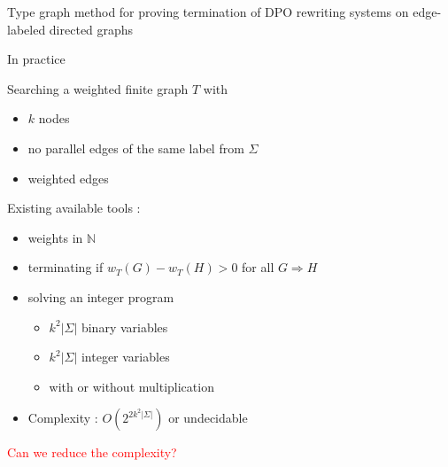\documentclass{beamer}
\begin{document}
\begin{frame}{Type graph method for proving termination of DPO rewriting systems on edge-labeled directed graphs}

    In practice

      Searching a weighted finite graph \( T \) with 
      \begin{itemize}
        \item $k$ nodes
        \item no parallel edges of the same label from $\Sigma$
        \item weighted edges
      \end{itemize} 
      
      Existing available tools : 
      \begin{itemize}
          \item weights in $\mathbb{N}$ 
          \item terminating if $w_T(G) - w_T(H) > 0$ for all $G \Rightarrow H$
          \item solving an integer program 
                \begin{itemize}
                  \item $k^2|\Sigma|$ binary variables
                  \item $k^2|\Sigma|$ integer variables
                  \item with or without multiplication
                \end{itemize} 
          \item Complexity : $O(2^{2k^2|\Sigma|})$ or undecidable
      \end{itemize}


    \textcolor{red}{Can we reduce the complexity?}
\end{frame}
\end{document}
